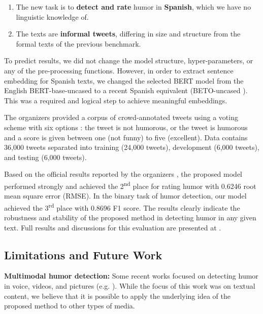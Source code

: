 \documentclass{article}
\begin{document}
\begin{enumerate}
  \item The new task is to \textbf{detect and rate} humor in \textbf{Spanish}, which we have no linguistic knowledge of.
  \item The texts are \textbf{informal tweets}, differing in size and structure from the formal texts of the previous benchmark.
\end{enumerate}

To predict results, we did not change the model structure, hyper-parameters, or any of the pre-processing functions. However, in order to extract sentence embedding for Spanish texts, we changed the selected BERT model from the English BERT-base-uncased to a recent Spanish equivalent (BETO-uncased \cite{CaneteCFP2020}). This was a required and logical step to achieve meaningful embeddings.

The organizers provided a corpus of crowd-annotated tweets using a voting scheme with six options \cite{chiruzzo2020haha}: the tweet is not humorous, or the tweet is humorous and a score is given between one (not funny) to five (excellent). Data contains 36,000 tweets separated into training (24,000 tweets), development (6,000 tweets), and testing (6,000 tweets).



Based on the official results reported by the organizers \cite{haha2021overview}, the proposed model performed strongly and achieved the 2\textsuperscript{nd} place for rating humor with 0.6246 root mean square error (RMSE). In the binary task of humor detection, our model achieved the 3\textsuperscript{rd} place with 0.8696 F1 score. The results clearly indicate the robustness and stability of the proposed method in detecting humor in any given text. Full results and discussions for this evaluation are presented at \cite{annamoradnejad2021colbert}.

\subsection{Limitations and Future Work}
\label{sec:limits}

\textbf{Multimodal humor detection:} Some recent works focused on detecting humor in voice, videos, and pictures (e.g. \cite{hasan2019ur, choube2020punchline, patro2021multimodal, wu2021mumor}). While the focus of this work was on textual content, we believe that it is possible to apply the underlying idea of the proposed method to other types of media.
\end{document}
